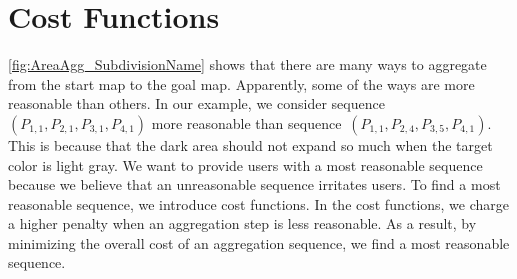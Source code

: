 \section{Cost Functions}
\label{sec:AreaAgg_CostFunctions}

\fig\ref{fig:AreaAgg_SubdivisionName} shows that there are many 
ways to aggregate from the start map to the goal map.
Apparently, some of the ways are more reasonable than others.
In our example, we consider 
sequence~$(P_{1,1}, P_{2,1},P_{3,1},P_{4,1})$ 
more reasonable than 
sequence~$(P_{1,1}, P_{2,4},P_{3,5},P_{4,1})$.
This is because that the dark area should not expand so much
when the target color is light gray.
We want to provide users with a most reasonable sequence 
because we believe that an unreasonable sequence irritates users.
To find a most reasonable sequence, we introduce cost functions.
In the cost functions, we charge a higher penalty 
when an aggregation step is less reasonable.
As a result, by minimizing the overall cost of an aggregation 
sequence, we find a most reasonable sequence.

